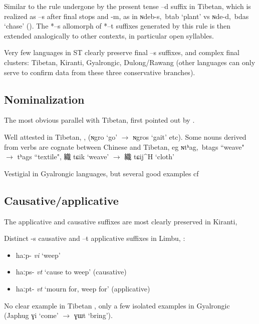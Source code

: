 \documentclass[oldfontcommands,oneside,a4paper,11pt]{article}
\newcommand{\ipa}[1]{{\phon \mbox{#1}}} %
\newcommand{\zh}[1]{{\cn #1}}
\newcommand{\ch}[3]{\zh{#1} \ipa{#2} `#3'}
\begin{document}
Similar to the rule undergone by the present tense \ipa{--d} suffix in Tibetan, which is realized as \ipa{--s} after final stops and \ipa{-m}, as in \ipa{ɴdeb-s, btab}   `plant' vs \ipa{ɴde-d, bdas}   `chase' (\citealt[52-53]{coblin76}). The *\ipa{--s} allomorph of *\ipa{--t} suffixes generated by this rule is then extended analogically to other contexts, in particular open syllables.


Very few languages in ST clearly preserve final \ipa{--s} suffixes, and complex final clusters: Tibetan, Kiranti, Gyalrongic, Dulong/Rawang (other languages can only serve to confirm data from these three conservative branches). 

\subsection{Nominalization}
The most obvious parallel with Tibetan, first pointed out by \citet{forrest60occlusives}.

Well attested in Tibetan, \citet[43]{conrady1896}, \citet[624-5]{hill14derivational} (\ipa{ɴgro} `go'  $\rightarrow$ \ipa{ɴgros} `gait' etc). Some nouns derived from verbs are cognate between Chinese and Tibetan, eg \ipa{ɴtʰag, btags} ``weave" $\rightarrow$ \ipa{tʰags} ``textile", \ch{織}{tɕik}{weave} $\rightarrow$ \ch{織}{tɕij^H}{cloth} 

Vestigial in Gyalrongic languages, but several good examples cf \citet{jacques03s.houzhui}

 

\subsection{Causative/applicative}
The applicative and causative suffixes are most clearly preserved in Kiranti, \citet{michailovsky85dental, jacques15derivational.khaling}

Distinct \ipa{-s} causative and \ipa{--t} applicative suffixes in Limbu, \citealt{michailovsky02dico}:
\begin{itemize}
\item \ipa{haːp-} \textit{vi} `weep'
\item \ipa{haːps-} \textit{vt} `cause to weep' (causative)
\item \ipa{haːpt-} \textit{vt} `mourn for, weep for' (applicative)
\end{itemize}

No clear example in Tibetan \citet[630]{hill14derivational}, only a few isolated examples in Gyalrongic (Japhug \ipa{ɣi} `come' $\rightarrow$ \ipa{ɣɯt} `bring').
\end{document}
